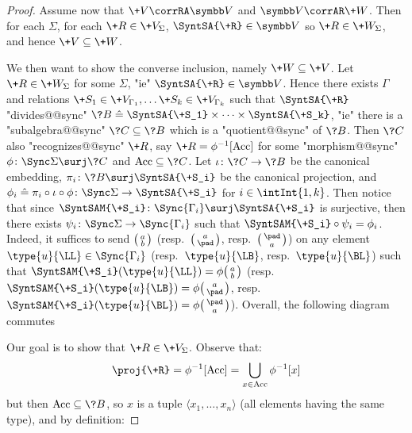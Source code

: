 \begin{proof}
	 Assume now that $\+V \corrRA \B{V}$
	and $\B{V} \corrAR \+W$. Then for each $\Sigma$, for each $\+R \in \+V_{\Sigma}$,
	$\SyntSA{\+R} \in \B{V}$ so $\+R \in \+W_{\Sigma}$, and hence $\+V \subseteq \+W$.

	We then want to show the converse inclusion, namely $\+W \subseteq \+V$. Let $\+R \in \+W_{\Sigma}$ for some $\Sigma$, "ie" $\SyntSA{\+R} \in \B{V}$.
	Hence there exists $\Gamma$ and relations $\+S_1 \in \+V_{\Gamma_1}, \hdots \+S_k \in \+V_{\Gamma_k}$
	such that $\SyntSA{\+R}$ "divides@@sync"
	$\?B \defeq \SyntSA{\+S_1} \times \cdots \times \SyntSA{\+S_k}$,
	"ie" there is a "subalgebra@@sync" $\?C \subseteq \?B$ which is a "quotient@@sync" of $\?B$.
	Then $\?C$ also "recognizes@@sync" $\+R$, say $\+R = \phi^{-1}[\Acc]$ for some
	"morphism@@sync" $\phi\colon \Sync\Sigma \surj \?C$ and $\Acc \subseteq \?C$.
	Let $\iota\colon \?C \to \?B$ be the canonical embedding,
	$\pi_i\colon \?B \surj \SyntSA{\+S_i}$ be the canonical projection,
	and $\phi_i \defeq \pi_i \circ \iota \circ \phi\colon \Sync\Sigma \to \SyntSA{\+S_i}$
	for $i \in \intInt{1,k}$. Then notice that since $\SyntSAM{\+S_i}\colon \Sync{\Gamma_i} \surj \SyntSA{\+S_i}$ is surjective, then there exists $\psi_i \colon \Sync\Sigma \to \Sync{\Gamma_i}$ such that $\SyntSAM{\+S_i} \circ \psi_i = \phi_i$. Indeed, it suffices
	to send $\pair{a}{b}$ (resp.~$\pair{a}{\pad}$, resp.~$\pair{\pad}{a}$)
	on any element $\type{u}{\LL} \in \Sync{\Gamma_i}$ (resp.~$\type{u}{\LB}$,
	resp.~$\type{u}{\BL}$) such that $\SyntSAM{\+S_i}(\type{u}{\LL}) = \phi\pair{a}{b}$
	(resp.~$\SyntSAM{\+S_i}(\type{u}{\LB}) = \phi\pair{a}{\pad}$,
	resp.~$\SyntSAM{\+S_i}(\type{u}{\BL}) = \phi\pair{\pad}{a}$). Overall, the following diagram
	commutes
	\begin{center}
	\end{center}
	Our goal is to show that $\+R \in \+V_{\Sigma}$. Observe that:
	\[
		\proj{\+R} =
		\phi^{-1}[\Acc] = \bigcup_{x \in \Acc} \phi^{-1}[x]
	\]
	but then $\Acc \subseteq \?B$, so $x$ is a tuple $\langle x_1, \hdots, x_n \rangle$
	(all elements having the same type), and by definition:

\end{proof}
